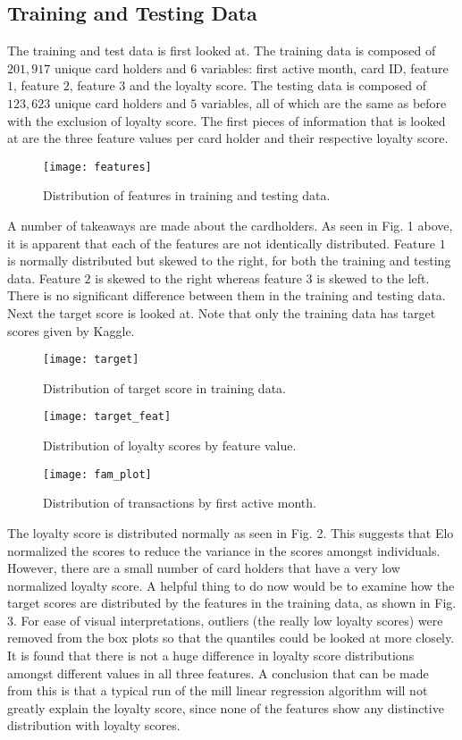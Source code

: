 \documentclass[journal, a4paper]{IEEEtran}
\begin{document}
\subsection{Training and Testing Data}
The training and test data is first looked at. The training data is composed of $201,917$ unique card holders and $6$ variables: first active month, card ID, feature $1$, feature $2$, feature $3$ and the loyalty score. The testing data is composed of $123,623$ unique card holders and $5$ variables, all of which are the same as before with the exclusion of loyalty score. The first pieces of information that is looked at are the three feature values per card holder and their respective loyalty score. \begin{figure}[h!] \texttt{[image: features]} \caption{Distribution of features in training and testing data.} \end{figure}A number of takeaways are made about the cardholders. As seen in Fig. 1 above, it is apparent that each of the features are not identically distributed. Feature $1$ is normally distributed but skewed to the right, for both the training and testing data. Feature $2$ is skewed to the right whereas feature $3$ is skewed to the left. There is no significant difference between them in the training and testing data. Next the target score is looked at. Note that only the training data has target scores given by Kaggle.  \begin{figure}[h!] \texttt{[image: target]} \caption{Distribution of target score in training data.} \end{figure}
 \begin{figure}[b] \texttt{[image: target\_feat]} \caption{Distribution of loyalty scores by feature value.} \end{figure}
 \begin{figure}[h!] \texttt{[image: fam\_plot]} \caption{Distribution of transactions by first active month.} \end{figure}
The loyalty score is distributed normally as seen in Fig. 2. This suggests that Elo normalized the scores to reduce the variance in the scores amongst individuals. However, there are a small number of card holders that have a very low normalized loyalty score. A helpful thing to do now would be to examine how the target scores are distributed by the features in the training data, as shown in Fig. 3. For ease of visual interpretations, outliers (the really low loyalty scores) were removed from the box plots so that the quantiles could be looked at more closely. It is found that there is not a huge difference in loyalty score distributions amongst different values in all three features. A conclusion that can be made from this is that a typical run of the mill linear regression algorithm will not greatly explain the loyalty score, since none of the features show any distinctive distribution with loyalty scores. 
\end{document}
